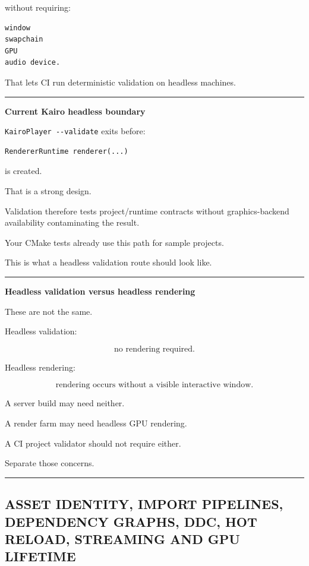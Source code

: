 without requiring:

\begin{verbatim}
window
swapchain
GPU
audio device.
\end{verbatim}

That lets CI run deterministic validation on headless machines.

\begin{center}\rule{0.5\linewidth}{0.5pt}\end{center}

\textbf{Current Kairo headless boundary}

\texttt{KairoPlayer\ -\/-validate} exits before:

\begin{verbatim}
RendererRuntime renderer(...)
\end{verbatim}

is created.

That is a strong design.

Validation therefore tests project/runtime contracts without graphics-backend availability contaminating the result.

Your CMake tests already use this path for sample projects.

This is what a headless validation route should look like.

\begin{center}\rule{0.5\linewidth}{0.5pt}\end{center}

\textbf{Headless validation versus headless rendering}

These are not the same.

Headless validation:

\[
\text{no rendering required}.
\]

Headless rendering:

\[
\text{rendering occurs without a visible interactive window}.
\]

A server build may need neither.

A render farm may need headless GPU rendering.

A CI project validator should not require either.

Separate those concerns.

\begin{center}\rule{0.5\linewidth}{0.5pt}\end{center}

\subsection{ASSET IDENTITY, IMPORT PIPELINES, DEPENDENCY GRAPHS, DDC, HOT RELOAD, STREAMING AND GPU LIFETIME}\label{05-engine-i-ch010-asset-identity-import-pipelines-dependency-graphs-ddc-hot-reload-streaming-and-gpu-lifetime}


